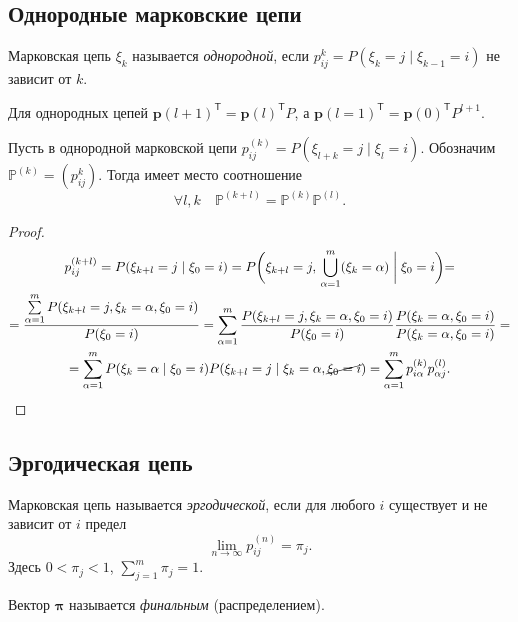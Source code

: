 \subsection{Однородные марковские цепи}
\begin{definition}
  Марковская цепь $\xi_k$ называется \emph{однородной}, если $p_{ij}^k =
  P(\xi_k=j \mid \xi_{k-1}=i)$ не
  зависит от $ k $.
\end{definition}
Для однородных цепей $\mathbf{p}(l+1)^{\mathsf T} = \mathbf{p}(l)^{\mathsf T} P$, а
$\mathbf{p}(l=1)^{\mathsf T} = \mathbf{p}(0)^{\mathsf T} P^{l+1}$.

\begin{theorem}
  Пусть в однородной марковской цепи $p_{ij}^{(k)} = P(\xi_{l+k} = j \mid
  \xi_l=i)$. Обозначим
  $\mathbb{P}^{(k)} = (p_{ij}^k)$. Тогда имеет место соотношение
  \[
    \forall l, k \quad \mathbb{P}^{(k+l)} = \mathbb{P}^{(k)} \mathbb{P}^{(l)}.
  \]
\end{theorem}
\begin{proof}
  \begin{multline*}
    p_{ij}^{(k+l)} = P(\xi_{k+l}=j \mid \xi_0 = i)
    = P\biggl(\xi_{k+l}=j,\, \bigcup_{\alpha=1}^m (\xi_k=\alpha) \biggm| \xi_0 =
      i\biggl) = \\
    = \dfrac{\sum\limits_{\alpha=1}^m P(\xi_{k+l} = j, \xi_k = \alpha, \xi_0=i)}{P(\xi_0=i)}
    = \sum_{\alpha=1}^m \dfrac{P(\xi_{k+l} = j, \xi_k = \alpha, \xi_0=i)}{P(\xi_0=i)} \dfrac{P(\xi_k=\alpha, \xi_0=i)}{P(\xi_k=\alpha, \xi_0=i)} = \\
    = \sum_{\alpha=1}^m P(\xi_k=\alpha\mid\xi_0=i) P(\xi_{k+l}=j \mid \xi_k = \alpha, \cancel{\xi_0=i})
    = \sum_{\alpha=1}^m p_{i\alpha}^{(k)} p_{\alpha j}^{(l)}.
  \end{multline*}
\end{proof}

\subsection{Эргодическая цепь}

\begin{definition}
  Марковская цепь называется \emph{эргодической}, если для любого $ i $ существует и не зависит
  от $ i $ предел
  \[
    \lim_{n\to\infty} p_{ij}^{(n)} = \pi_{j}.
  \]
  Здесь $0 < \pi_j < 1$, $\sum\limits_{j=1}^m \pi_j = 1$.

  Вектор $\bm{\pi}$ называется \emph{финальным} (распределением).
\end{definition}

